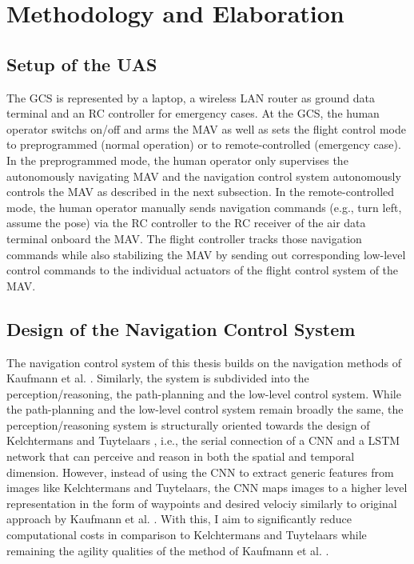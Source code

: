 \section{Methodology and Elaboration}


\subsection{Setup of the UAS}

The GCS is represented by a laptop, a wireless LAN router as ground data terminal and an RC controller for emergency cases.
At the GCS, the human operator switchs on/off and arms the MAV as well as sets the flight control mode to preprogrammed (normal operation)
or to remote-controlled (emergency case).
In the preprogrammed mode, the human operator only supervises the autonomously navigating MAV and
the navigation control system autonomously controls the MAV as described in the next subsection.
In the remote-controlled mode, 
the human operator manually sends navigation commands (e.g., turn left, assume the pose) via the RC controller
to the RC receiver of the air data terminal onboard the MAV.
The flight controller tracks those navigation commands while also stabilizing the MAV
by sending out corresponding low-level control commands  to the individual actuators of the flight control system of the MAV.





\subsection{Design of the Navigation Control System}

The navigation control system of this thesis builds on the navigation methods of Kaufmann et al. \cite{Kaufmann2018}.
Similarly, the system is subdivided into the perception/reasoning, the path-planning and the low-level control system.
While the path-planning and the low-level control system remain broadly the same,
the perception/reasoning system is structurally oriented towards the design of Kelchtermans and Tuytelaars \cite{Kelchtermans2017},
i.e., the serial connection of a CNN and a LSTM network that can perceive and reason in both the spatial and temporal dimension.
However, instead of using the CNN to extract generic features from images like Kelchtermans and Tuytelaars,
the CNN maps images to a higher level representation in the form of waypoints and desired velociy 
similarly to original approach by Kaufmann et al. \cite{Kaufmann2018}.
With this, I aim to significantly reduce computational costs in comparison to Kelchtermans and Tuytelaars
while remaining the agility qualities of the method of Kaufmann et al. \cite{Kaufmann2018}.


